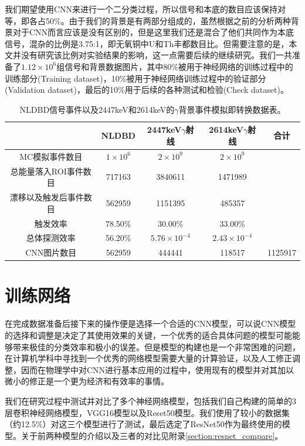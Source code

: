 我们期望使用CNN来进行一个二分类过程，所以信号和本底的数目应该保持对等，即各占50\%。由于我们的背景是有两部分组成的，虽然根据之前的分析两种背景对于CNN而言应该是没有区别的，但是这里我们还是混合了他们共同作为本底信号，混杂的比例是3.75:1，即无氧铜中U和Th丰都数目比。但需要注意的是，本文并没有研究该比例对实验结果的影响，这一点需要后续的继续研究。我们一共准备了$1.12\times10^6$组信号和背景数据图片，其中80\%被用于神经网络的训练过程中的训练部分(Training dataset)，10\%被用于神经网络训练过程中的验证部分(Validation dataset)，最后的10\%用于后续的各种测试和检验(Check dataset)。
        
\renewcommand\arraystretch{1.4}
\begin{table}
    \centering
    \begin{tabular*}{\textwidth}{@{\extracolsep{\fill}}ccccc}
        \hline
        \hline							
        	&	NLDBD	&	2447keV$\gamma$射线	&	2614keV$\gamma$射线	&	合计	\\
        \hline
        MC模拟事件数目	&	$1\times10^6$	&	$2\times10^9$	&	$2\times10^9$	&		\\
        总能量落入ROI事件数目	&	717163	&	3840611	&	1471989	&		\\
        漂移以及触发后事件数目	&	562959	&	1151395	&	485357	&		\\
        触发效率	&	78.50\%	&	30.00\%	&	33.00\%	&		\\
        总体探测效率	&	56.20\%	&	$5.76\times10^{-4}$	&	$2.43\times10^{-4}$	&		\\
        CNN图片数目	&	562959	&	444441	&	118517	&	1125917	\\
        \hline
        \hline
    \end{tabular*}
    \caption{NLDBD信号事件以及2447keV和2614keV的$\gamma$背景事件模拟即转换数据表。}
    \label{tab:convert}
  \end{table}

\section{训练网络}
\label{section:train}

在完成数据准备后接下来的操作便是选择一个合适的CNN模型，可以说CNN模型的选择和调整是决定了其使用效果的关键，一个优秀的适合具体问题的模型可能能够带来极佳的分类效率和极小的误差。但是模型的构建也是一个非常困难的问题，在计算机学科中寻找到一个优秀的网络模型需要大量的计算验证，以及人工修正调整，因而在物理学中对CNN进行基本应用的过程中，使用现有的模型并对其加以微小的修正是一个更为经济和有效率的事情。

我们在研究过程中测试并对比了多个神经网络模型，包括我们自己构建的简单的3层卷积神经网络模型，VGG16模型\supercite{simonyan2014very}以及Reset50模型\supercite{he2016deep}。我们使用了较小的数据集（约12.5\%）对这三个模型进行了测试，最后选定了ResNet50作为最终使用的模型。关于前两种模型的介绍以及三者的对比见附录\ref{section:resnet_compare}。

